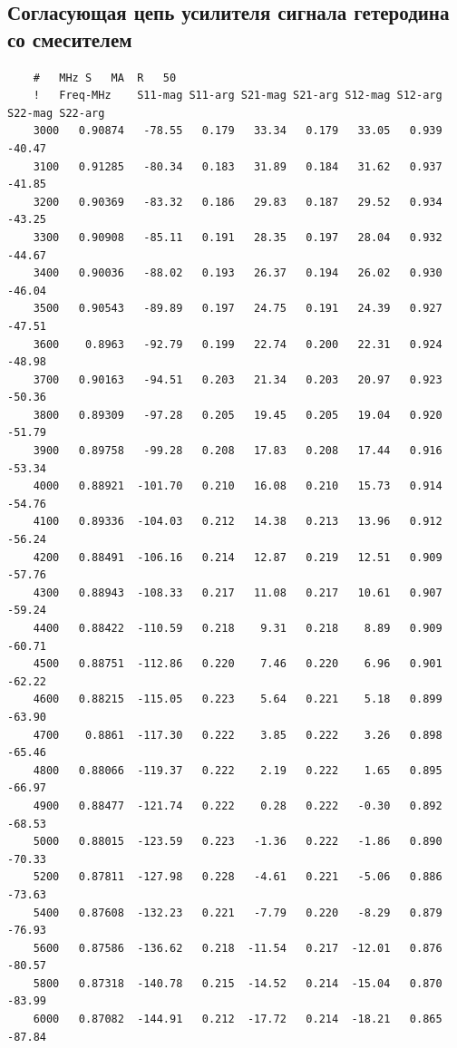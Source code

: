 \documentclass[utf8x, 14pt, oneside, a4paper]{article}
\begin{document}
	\subsection*{Согласующая цепь усилителя сигнала гетеродина со смесителем}
	\begin{lstlisting}
	#	MHz	S	MA	R	50										
	!	Freq-MHz	S11-mag	S11-arg	S21-mag	S21-arg	S12-mag	S12-arg	S22-mag	S22-arg	
	3000   0.90874   -78.55   0.179   33.34   0.179   33.05   0.939  -40.47
	3100   0.91285   -80.34   0.183   31.89   0.184   31.62   0.937  -41.85
	3200   0.90369   -83.32   0.186   29.83   0.187   29.52   0.934  -43.25
	3300   0.90908   -85.11   0.191   28.35   0.197   28.04   0.932  -44.67
	3400   0.90036   -88.02   0.193   26.37   0.194   26.02   0.930  -46.04
	3500   0.90543   -89.89   0.197   24.75   0.191   24.39   0.927  -47.51
	3600    0.8963   -92.79   0.199   22.74   0.200   22.31   0.924  -48.98
	3700   0.90163   -94.51   0.203   21.34   0.203   20.97   0.923  -50.36
	3800   0.89309   -97.28   0.205   19.45   0.205   19.04   0.920  -51.79
	3900   0.89758   -99.28   0.208   17.83   0.208   17.44   0.916  -53.34
	4000   0.88921  -101.70   0.210   16.08   0.210   15.73   0.914  -54.76
	4100   0.89336  -104.03   0.212   14.38   0.213   13.96   0.912  -56.24
	4200   0.88491  -106.16   0.214   12.87   0.219   12.51   0.909  -57.76
	4300   0.88943  -108.33   0.217   11.08   0.217   10.61   0.907  -59.24
	4400   0.88422  -110.59   0.218    9.31   0.218    8.89   0.909  -60.71
	4500   0.88751  -112.86   0.220    7.46   0.220    6.96   0.901  -62.22
	4600   0.88215  -115.05   0.223    5.64   0.221    5.18   0.899  -63.90
	4700    0.8861  -117.30   0.222    3.85   0.222    3.26   0.898  -65.46
	4800   0.88066  -119.37   0.222    2.19   0.222    1.65   0.895  -66.97
	4900   0.88477  -121.74   0.222    0.28   0.222   -0.30   0.892  -68.53
	5000   0.88015  -123.59   0.223   -1.36   0.222   -1.86   0.890  -70.33
	5200   0.87811  -127.98   0.228   -4.61   0.221   -5.06   0.886  -73.63
	5400   0.87608  -132.23   0.221   -7.79   0.220   -8.29   0.879  -76.93
	5600   0.87586  -136.62   0.218  -11.54   0.217  -12.01   0.876  -80.57
	5800   0.87318  -140.78   0.215  -14.52   0.214  -15.04   0.870  -83.99
	6000   0.87082  -144.91   0.212  -17.72   0.214  -18.21   0.865  -87.84
	\end{lstlisting}
	\pagebreak
	
\end{document}
